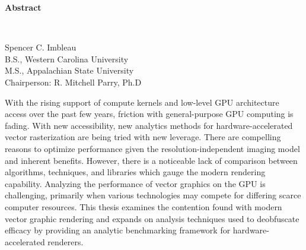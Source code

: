 \vspace*{0.5in}
\begin{center}
    \textbf{Abstract}\\[2ex]
    \bigskip
    \begin{spacing}{1.1}
    \begin{adjustwidth}{3cm}{3cm}
    \begin{center}
    \thesistitle
    \end{center}
    \end{adjustwidth}
    \end{spacing}
    \normalsize
    \bigskip
    Spencer C. Imbleau\\
    B.S., Western Carolina University\\
    M.S., Appalachian State University\\
    \bigskip
    Chairperson: R. Mitchell Parry, Ph.D
\end{center}

\begin{doublespace}
With the rising support of compute kernels and low-level GPU architecture access over the past few years, friction with general-purpose GPU computing is fading. With new accessibility, new analytics methods for hardware-accelerated vector rasterization are being tried with new leverage. There are compelling reasons to optimize performance given the resolution-independent imaging model and inherent benefits. However, there is a noticeable lack of comparison between algorithms, techniques, and libraries which gauge the modern rendering capability. Analyzing the performance of vector graphics on the GPU is challenging, primarily when various technologies may compete for differing scarce computer resources. This thesis examines the contention found with modern vector graphic rendering and expands on analysis techniques used to deobfuscate efficacy by providing an analytic benchmarking framework for hardware-accelerated renderers.
\end{doublespace}